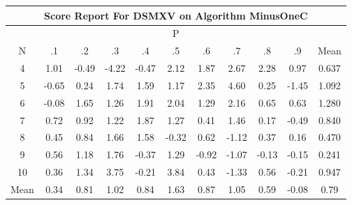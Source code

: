 \documentclass[11pt,a4paper]{report}
\begin{document}
\begin{longtable}{ | c || c | c | c | c | c | c | c | c | c || c |}
\hline
\multicolumn{11}{|c|}{ Score Report For DSMXV on Algorithm MinusOneC} \\
\hline
\multicolumn{11}{|c|}{ P } \\
\hline
N & .1 & .2 & .3 & .4 & .5 & .6 & .7 & .8 & .9 & Mean\\
 \hline
 \hline
 \endhead
  4 &  \cellcolor[HTML]{E7E7FF} 1.01 &  \cellcolor[HTML]{FFEFEF} -0.49 &  \cellcolor[HTML]{FF9797} -4.22 &  \cellcolor[HTML]{FFF7F7} -0.47 &  \cellcolor[HTML]{C7C7FF} 2.12 &  \cellcolor[HTML]{CFCFFF} 1.87 &  \cellcolor[HTML]{BFBFFF} 2.67 &  \cellcolor[HTML]{C7C7FF} 2.28 &  \cellcolor[HTML]{E7E7FF} 0.97 & 0.637 \\
  5 &  \cellcolor[HTML]{FFEFEF} -0.65 &  \cellcolor[HTML]{F7F7FF} 0.24 &  \cellcolor[HTML]{D7D7FF} 1.74 &  \cellcolor[HTML]{D7D7FF} 1.59 &  \cellcolor[HTML]{DFDFFF} 1.17 &  \cellcolor[HTML]{C7C7FF} 2.35 &  \cellcolor[HTML]{8F8FFF} 4.60 &  \cellcolor[HTML]{F7F7FF} 0.25 &  \cellcolor[HTML]{FFD7D7} -1.45 & 1.092 \\
  6 &  \cellcolor[HTML]{FFFFFF} -0.08 &  \cellcolor[HTML]{D7D7FF} 1.65 &  \cellcolor[HTML]{DFDFFF} 1.26 &  \cellcolor[HTML]{CFCFFF} 1.91 &  \cellcolor[HTML]{CFCFFF} 2.04 &  \cellcolor[HTML]{DFDFFF} 1.29 &  \cellcolor[HTML]{C7C7FF} 2.16 &  \cellcolor[HTML]{EFEFFF} 0.65 &  \cellcolor[HTML]{EFEFFF} 0.63 & 1.280 \\
  7 &  \cellcolor[HTML]{EFEFFF} 0.72 &  \cellcolor[HTML]{E7E7FF} 0.92 &  \cellcolor[HTML]{DFDFFF} 1.22 &  \cellcolor[HTML]{CFCFFF} 1.87 &  \cellcolor[HTML]{DFDFFF} 1.27 &  \cellcolor[HTML]{F7F7FF} 0.41 &  \cellcolor[HTML]{D7D7FF} 1.46 &  \cellcolor[HTML]{F7F7FF} 0.17 &  \cellcolor[HTML]{FFEFEF} -0.49 & 0.840 \\
  8 &  \cellcolor[HTML]{F7F7FF} 0.45 &  \cellcolor[HTML]{E7E7FF} 0.84 &  \cellcolor[HTML]{D7D7FF} 1.66 &  \cellcolor[HTML]{D7D7FF} 1.58 &  \cellcolor[HTML]{FFF7F7} -0.32 &  \cellcolor[HTML]{EFEFFF} 0.62 &  \cellcolor[HTML]{FFDFDF} -1.12 &  \cellcolor[HTML]{F7F7FF} 0.37 &  \cellcolor[HTML]{F7F7FF} 0.16 & 0.470 \\
  9 &  \cellcolor[HTML]{EFEFFF} 0.56 &  \cellcolor[HTML]{DFDFFF} 1.18 &  \cellcolor[HTML]{CFCFFF} 1.76 &  \cellcolor[HTML]{FFF7F7} -0.37 &  \cellcolor[HTML]{DFDFFF} 1.29 &  \cellcolor[HTML]{FFE7E7} -0.92 &  \cellcolor[HTML]{FFE7E7} -1.07 &  \cellcolor[HTML]{FFFFFF} -0.13 &  \cellcolor[HTML]{FFFFFF} -0.15 & 0.241 \\
  10 &  \cellcolor[HTML]{F7F7FF} 0.36 &  \cellcolor[HTML]{DFDFFF} 1.34 &  \cellcolor[HTML]{9F9FFF} 3.75 &  \cellcolor[HTML]{FFF7F7} -0.21 &  \cellcolor[HTML]{9F9FFF} 3.84 &  \cellcolor[HTML]{F7F7FF} 0.43 &  \cellcolor[HTML]{FFDFDF} -1.33 &  \cellcolor[HTML]{EFEFFF} 0.56 &  \cellcolor[HTML]{FFF7F7} -0.21 & 0.947 \\
 \hline
 \hline
Mean &  \cellcolor[HTML]{F7F7FF} 0.34 &  \cellcolor[HTML]{E7E7FF} 0.81 &  \cellcolor[HTML]{E7E7FF} 1.02 &  \cellcolor[HTML]{E7E7FF} 0.84 &  \cellcolor[HTML]{D7D7FF} 1.63 &  \cellcolor[HTML]{E7E7FF} 0.87 &  \cellcolor[HTML]{E7E7FF} 1.05 &  \cellcolor[HTML]{EFEFFF} 0.59 &  \cellcolor[HTML]{FFFFFF} -0.08 &  \cellcolor[HTML]{EFEFFF} 0.79
\end{longtable}
\end{document}
